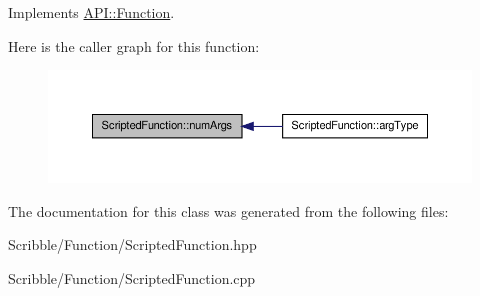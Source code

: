 Implements \hyperlink{class_a_p_i_1_1_function_ae56761ad4c849c05e12cb4cd02583c77}{A\-P\-I\-::\-Function}.



Here is the caller graph for this function\-:
\nopagebreak
\begin{figure}[H]
\begin{center}
\leavevmode
\includegraphics[width=350pt]{class_scripted_function_a33e6157dbf33043399a981b2f30c3957_icgraph}
\end{center}
\end{figure}




The documentation for this class was generated from the following files\-:\begin{DoxyCompactItemize}
\item 
Scribble/\-Function/Scripted\-Function.\-hpp\item 
Scribble/\-Function/Scripted\-Function.\-cpp\end{DoxyCompactItemize}
